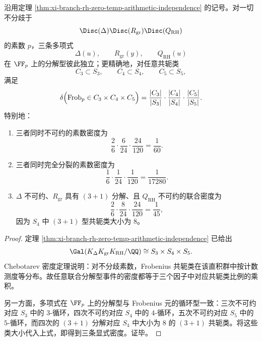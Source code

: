 \begin{corollary}\label{cor:xi-branch-rh-zero-temp-chebotarev-product-densities}
沿用定理 \ref{thm:xi-branch-rh-zero-temp-arithmetic-independence} 的记号。对一切不分歧于
\[
\Disc(\Delta)\Disc(R_{\mathrm{gr}})\Disc(Q_{\mathrm{RH}})
\]
的素数 \(p\)，三条多项式
\[
\Delta(u),\qquad R_{\mathrm{gr}}(y),\qquad Q_{\mathrm{RH}}(u)
\]
在 \(\FF_p\) 上的分解型彼此独立；更精确地，对任意共轭类
\[
C_3\subset S_3,\qquad C_4\subset S_4,\qquad C_5\subset S_5,
\]
满足
\[
\delta\Bigl(\mathrm{Frob}_p\in C_3\times C_4\times C_5\Bigr)
=
\frac{|C_3|}{|S_3|}\cdot \frac{|C_4|}{|S_4|}\cdot \frac{|C_5|}{|S_5|}.
\]
特别地：
\begin{enumerate}
  \item 三者同时不可约的素数密度为
  \[
  \boxed{\;
  \frac{2}{6}\cdot\frac{6}{24}\cdot\frac{24}{120}
  =
  \frac{1}{60}.\;}
  \]
  \item 三者同时完全分裂的素数密度为
  \[
  \boxed{\;
  \frac{1}{6}\cdot\frac{1}{24}\cdot\frac{1}{120}
  =
  \frac{1}{17280}.\;}
  \]
  \item \(\Delta\) 不可约、\(R_{\mathrm{gr}}\) 具有 \((3+1)\) 分解、且 \(Q_{\mathrm{RH}}\) 不可约的联合密度为
  \[
  \boxed{\;
  \frac{2}{6}\cdot\frac{8}{24}\cdot\frac{24}{120}
  =
  \frac{1}{45},\;}
  \]
  因为 \(S_4\) 中 \((3+1)\) 型共轭类大小为 \(8\)。
\end{enumerate}
\end{corollary}
\begin{proof}
定理 \ref{thm:xi-branch-rh-zero-temp-arithmetic-independence} 已给出
\[
\Gal(K_\Delta K_{\mathrm{gr}}K_{\mathrm{RH}}/\QQ)\cong S_3\times S_4\times S_5.
\]
Chebotarev 密度定理说明：对不分歧素数，Frobenius 共轭类在该直积群中按计数测度等分布。故任意联合分解型事件的密度都等于三个因子中对应共轭类比例的乘积。
\par
另一方面，多项式在 \(\FF_p\) 上的分解型与 Frobenius 元的循环型一致：三次不可约对应 \(S_3\) 中的 \(3\)-循环，四次不可约对应 \(S_4\) 中的 \(4\)-循环，五次不可约对应 \(S_5\) 中的 \(5\)-循环，而四次的 \((3+1)\) 分解对应 \(S_4\) 中大小为 \(8\) 的 \((3+1)\) 共轭类。将这些类大小代入上式，即得到三条显式密度。证毕。
\end{proof}




\endinput
